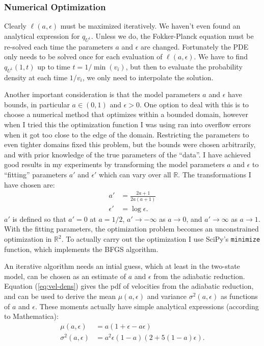 \documentclass{article}
\def\R{\mathbb{R}}
\begin{document}
\subsubsection{Numerical Optimization}
\label{sec:numer-optim}

Clearly $\ell(a, \epsilon)$ must be maximized iteratively. We haven't
even found an analytical expression for $q_{U^1}$. Unless we do, the
Fokker-Planck equation must be re-solved each time the parameters $a$
and $\epsilon$ are changed. Fortunately the PDE only needs to be
solved once for each evaluation of $\ell(a, \epsilon)$. We have to
find $q_{U^1}(1, t)$ up to time $t = 1/\min(v_i)$, but then to
evaluate the probability density at each time $1/v_i$, we only need to
interpolate the solution.

Another important consideration is that the model parameters $a$ and
$\epsilon$ have bounds, in particular $a \in (0, 1)$ and
$\epsilon > 0$. One option to deal with this is to choose a numerical
method that optimizes within a bounded domain, however when I tried
this the optimization function I was using ran into overflow errors
when it got too close to the edge of the domain. Restricting the
parameters to even tighter domains fixed this problem, but the bounds
were chosen arbitrarily, and with prior knowledge of the true
parameters of the ``data''. I have achieved good results in my
experiments by transforming the model parameters $a$ and $\epsilon$ to
``fitting'' parameters $a'$ and $\epsilon'$ which can vary over all
$\R$. The transformations I have chosen are:
\begin{align}
  \label{eq:a-fwd-trns}
  a' &= \frac{2a + 1}{2a(a + 1)} \\
  \label{eq:e-fwd-trns}
  \epsilon' &= \log \epsilon.
\end{align}
$a'$ is defined so that $a'=0$ at $a=1/2$, $a' \rightarrow -\infty$ as
$a \rightarrow 0$, and $a' \rightarrow \infty$ as $a \rightarrow
1$. With the fitting parameters, the optimization problem becomes an
unconstrained optimization in $\R^2$. To actually carry out the
optimization I use SciPy's \verb|minimize| function, which implements
the BFGS algorithm.

An iterative algorithm needs an intial guess, which at least in the
two-state model, can be chosen as an estimate of $a$ and $\epsilon$
from the adiabatic reduction. Equation (\ref{eq:vel-dens}) gives the
pdf of velocities from the adiabatic reduction, and can be used to
derive the mean $\mu(a, \epsilon)$ and variance $\sigma^2(a,
\epsilon)$ as functions of $a$ and $\epsilon$. These moments actually
have simple analytical expressions (according to Mathematica):
\begin{align}
  \label{eq:mean-ar}
  \mu(a, \epsilon) &= a(1 + \epsilon - a \epsilon) \\
  \label{eq:var-ar}
  \sigma^2(a, \epsilon) &= a^2 \epsilon (1 - a) (2 + 5(1 - a) \epsilon).
\end{align}
\end{document}
